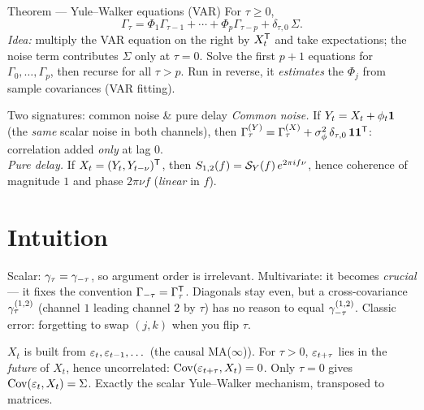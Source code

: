 \documentclass[11pt]{article}
\begin{document}
\begin{result}{Theorem --- Yule--Walker equations (VAR)}
For $\tau\ge0$,
\[
\Gamma_\tau=\Phi_1\Gamma_{\tau-1}+\cdots+\Phi_p\Gamma_{\tau-p}+\delta_{\tau,0}\,\Sigma .
\]
\emph{Idea:} multiply the VAR equation on the right by $X_t^{\mathsf{T}}$ and take expectations; the noise term contributes $\Sigma$ only at $\tau=0$. Solve the first $p+1$ equations for $\Gamma_0,\dots,\Gamma_p$, then recurse for all $\tau>p$. Run in reverse, it \emph{estimates} the $\Phi_j$ from sample covariances (VAR fitting).
\end{result}

\begin{result}{Two signatures: common noise \& pure delay}
\emph{Common noise.} If $Y_t=X_t+\phi_t\mathbf{1}$ (the \emph{same} scalar noise in both channels), then $\Gamma_\tau^{(Y)}=\Gamma_\tau^{(X)}+\sigma_\phi^2\,\delta_{\tau,0}\,\mathbf{1}\mathbf{1}^{\mathsf{T}}$: correlation added \emph{only} at lag $0$.\\
\emph{Pure delay.} If $X_t=(Y_t,Y_{t-\nu})^{\mathsf{T}}$, then $S_{1,2}(f)=\mathcal{S}_Y(f)\,e^{2\pi if\nu}$, hence coherence of magnitude $1$ and phase $2\pi\nu f$ (\emph{linear} in $f$).
\end{result}

\section*{Intuition}

\begin{intu}
Scalar: $\gamma_\tau=\gamma_{-\tau}$, so argument order is irrelevant. Multivariate: it becomes \emph{crucial} --- it fixes the convention $\Gamma_{-\tau}=\Gamma_\tau^{\mathsf{T}}$. Diagonals stay even, but a cross-covariance $\gamma_\tau^{(1,2)}$ (channel $1$ leading channel $2$ by $\tau$) has no reason to equal $\gamma_{-\tau}^{(1,2)}$. Classic error: forgetting to swap $(j,k)$ when you flip $\tau$.
\end{intu}

\begin{intu}[The noise only shows up at $\tau=0$]
$X_t$ is built from $\varepsilon_t,\varepsilon_{t-1},\dots$ (the causal MA($\infty$)). For $\tau>0$, $\varepsilon_{t+\tau}$ lies in the \emph{future} of $X_t$, hence uncorrelated: $\operatorname{Cov}(\varepsilon_{t+\tau},X_t)=0$. Only $\tau=0$ gives $\operatorname{Cov}(\varepsilon_t,X_t)=\Sigma$. Exactly the scalar Yule--Walker mechanism, transposed to matrices.
\end{intu}
\end{document}
